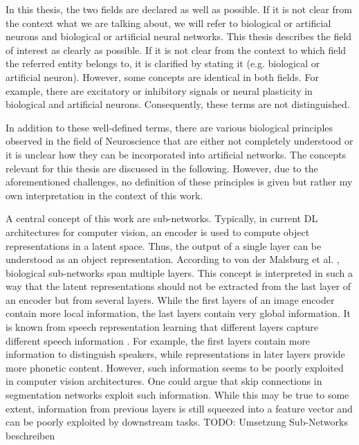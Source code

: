 In this thesis, the two fields are declared as well as possible.
If it is not clear from the context what we are talking about, we will refer to biological or artificial neurons and biological or artificial neural networks.
This thesis describes the field of interest as clearly as possible.
If it is not clear from the context to which field the referred entity belongs to, it is clarified by stating it (e.g. biological or artificial neuron).
However, some concepts are identical in both fields.
For example, there are excitatory or inhibitory signals or neural plasticity in biological and artificial neurons.
Consequently, these terms are not distinguished.

In addition to these well-defined terms, there are various biological principles observed in the field of Neuroscience that are either not completely understood or it is unclear how they can be incorporated into artificial networks.
The concepts relevant for this thesis are discussed in the following.
However, due to the aforementioned challenges, no definition of these principles is given but rather my own interpretation in the context of this work.

A central concept of this work are sub-networks.
Typically, in current DL architectures for computer vision, an encoder is used to compute object representations in a latent space.
Thus, the output of a single layer can be understood as an object representation.
According to von der Malsburg et al. \cite{von_der_Malsburg_Stadelmann_Grewe_2022}, biological sub-networks span multiple layers.
This concept is interpreted in such a way that the latent representations should not be extracted from the last layer of an encoder but from several layers.
While the first layers of an image encoder contain more local information, the last layers contain very global information.
It is known from speech representation learning that different layers capture different speech information .
For example, the first layers contain more information to distinguish speakers, while representations in later layers provide more phonetic content.
However, such information seems to be poorly exploited in computer vision architectures.
One could argue that skip connections in segmentation networks  exploit such information.
While this may be true to some extent, information from previous layers is still squeezed into a feature vector and can be poorly exploited by downstream tasks.
TODO: Umsetzung Sub-Networks beschreiben

